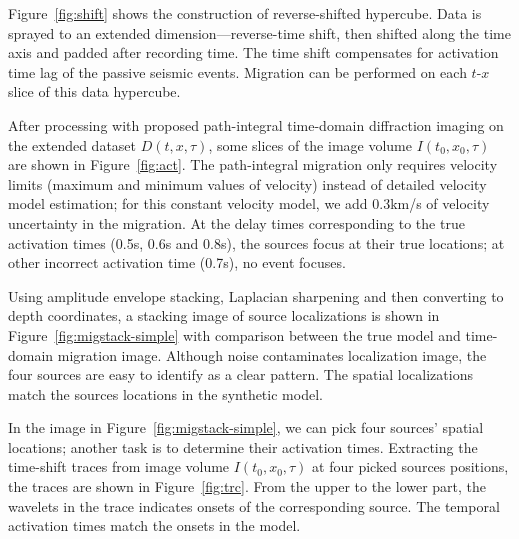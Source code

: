 Figure~\ref{fig:shift} shows the construction of reverse-shifted hypercube.
Data is sprayed to an extended dimension---reverse-time shift, then shifted along the time axis and padded after recording time.
The time shift compensates for activation time lag of the passive seismic events. Migration can be performed on each $t$-$x$ slice of this data hypercube.

After processing with proposed path-integral time-domain diffraction imaging on the extended dataset $D(t,x,\tau)$, some slices of the image volume $I(t_0,x_0,\tau)$
are shown in Figure~\ref{fig:act}.
The path-integral migration only requires velocity limits (maximum and minimum values of velocity) instead of detailed velocity model estimation; for this constant velocity model, we add 0.3km/s of velocity uncertainty in the migration.
At the delay times corresponding to the true activation times (0.5s, 0.6s and 0.8s), the sources focus at their true locations; at other incorrect activation time (0.7s), no event focuses.

Using amplitude envelope stacking, Laplacian sharpening and then converting to depth coordinates, a stacking image of source localizations is shown in Figure~\ref{fig:migstack-simple} with comparison between the true model and time-domain migration image.
Although noise contaminates localization image, the four sources are easy to identify as a clear pattern.
The spatial localizations match the sources locations in the synthetic model.

In the image in Figure~\ref{fig:migstack-simple}, we can pick four sources' spatial locations; another task is to determine their activation times.
Extracting the time-shift traces from image volume $I(t_0,x_0,\tau)$ at four picked sources positions, the traces are shown in Figure~\ref{fig:trc}.
From the upper to the lower part, the wavelets in the trace indicates onsets of the corresponding source.
The temporal activation times match the onsets in the model.

